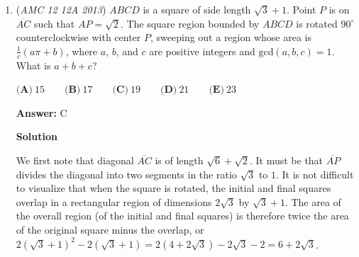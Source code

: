 \begin{enumerate}
 For probability, as Richard Rusczyk says the total possibilities over the total successful outcomes Possibilities--> which are A=1-9, B=0-9, and C=0-9 --> 9 x 10 x 10 = 900

 Successful Outcomes--> which are from the casework above --> 
 \[(9 \cdot 10) + (8 \cdot 9) + (7 \cdot 8) + (6 \cdot 7) + (5 \cdot 6) + (4 \cdot 5) + (3 \cdot 4) + (2 \cdot 3) + (1 \cdot 2)\] = $90 + 72 + 56 + 42 + 30 + 20 + 12 + 6 + 2 = 330$ 

 330/900 = $\boxed{\textbf{(E)} \ \frac{11}{30}}$

 \href{https://artofproblemsolving.com/videos/amc/2013amc12a/361}{https://artofproblemsolving.com/videos/amc/2013amc12a/361}

 


	\item (\textit{AMC 12 12A 2013}) $ABCD$ is a square of side length $\sqrt{3} + 1$. Point $P$ is on $\overline{AC}$ such that $AP = \sqrt{2}$. The square region bounded by $ABCD$ is rotated $90^{\circ}$ counterclockwise with center $P$, sweeping out a region whose area is $\frac{1}{c} (a \pi + b)$, where $a$, $b$, and $c$ are positive integers and $\text{gcd}(a,b,c) = 1$. What is $a + b + c$?


 $\textbf{(A)} \ 15 \qquad \textbf{(B)} \ 17 \qquad \textbf{(C)} \ 19 \qquad \textbf{(D)} \ 21 \qquad \textbf{(E)} \ 23$

 \textbf{Answer: }C



\textbf{Solution}

We first note that diagonal $\overline{AC}$ is of length $\sqrt{6} + \sqrt{2}$. It must be that $\overline{AP}$ divides the diagonal into two segments in the ratio $\sqrt{3}$ to $1$. It is not difficult to visualize that when the square is rotated, the initial and final squares overlap in a rectangular region of dimensions $2\sqrt{3}$ by $\sqrt{3} + 1$. The area of the overall region (of the initial and final squares) is therefore twice the area of the original square minus the overlap, or $2 (\sqrt{3} + 1)^2 - 2 (\sqrt{3} + 1) = 2 (4 + 2 \sqrt{3}) - 2 \sqrt{3} - 2 = 6 + 2 \sqrt{3}$.


\end{enumerate}
